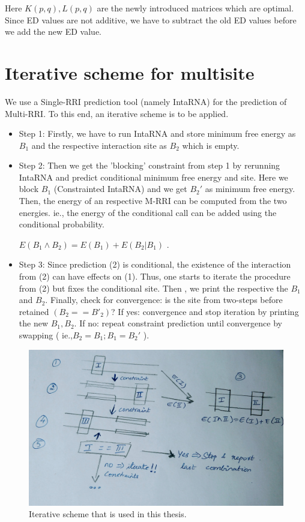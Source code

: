 \documentclass[twoside,a4paper]{report}
\begin{document}
	Here $K(p,q) , L(p,q)$ are the newly introduced matrices which are optimal. Since ED values are not additive, we have to subtract the old ED values before we add the new ED value.
	
	\section{Iterative scheme for multisite}
	 We use a Single-RRI prediction tool (namely IntaRNA) for the prediction of Multi-RRI. To this end, an iterative scheme is to be applied.
	
	 
	 \begin{itemize}
	 	 
	
	 \item Step 1: Firstly, we have to run IntaRNA and store minimum free energy as $B_1$ and the respective interaction site as $B_2$ which is empty.
	 \item Step 2: Then we get the 'blocking' constraint from step 1 by rerunning IntaRNA and predict conditional minimum free energy and site. Here we block $B_1$ (Constrainted IntaRNA) and we get $B_2'$ as minimum free energy. Then, the energy of an respective M-RRI can be computed from the two energies. ie., the energy of the conditional call can be added using the conditional probability.\\
	 \begin{center}
	 	 $E(B_1 \land B_2) = E(B_1) + E(B_2 | B_1)$ .
	 \end{center}
	 
	 \item Step 3: Since prediction (2) is conditional, the existence of the interaction from (2) can have effects on (1). Thus, one starts to iterate the procedure from (2) but fixes the conditional site. Then , we print the respective the $B_1$ and $B_2$. Finally, check for convergence: is the site from two-steps before retained $(B_2 == B'_2)$? If yes: convergence and stop iteration by printing the new $B_1 , B_2$. If no: repeat constraint prediction until convergence by swapping ( ie.,$B_2 = B_1; B_1 = B_2'$ ).
	 
	  \end{itemize}
  
  	
  	 \begin{figure}[tb]
  		\includegraphics[width=0.9\linewidth]{idea}
  		\centering
  		\caption{ Iterative scheme that is used in this thesis.} 
  		\label{fig:idea}
 	 \end{figure}
  
\end{document}
